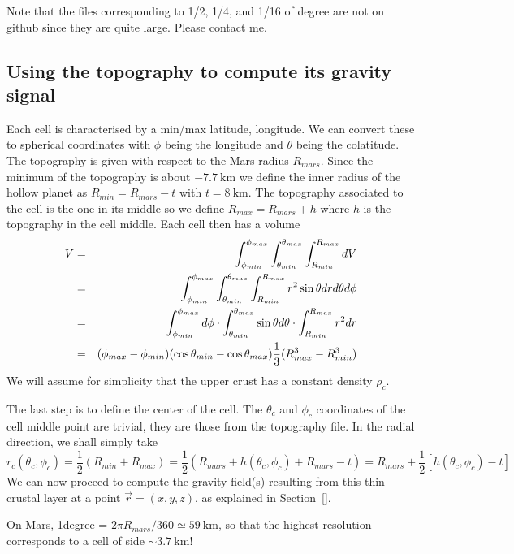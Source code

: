 Note that the files corresponding to 1/2, 1/4, and 1/16 of degree are not on github since they are quite large. 
Please contact me.

\subsection*{Using the topography to compute its gravity signal}

Each cell is characterised by a min/max latitude, longitude. We can convert these to 
spherical coordinates with $\phi$ being the longitude and $\theta$ being the colatitude.
The topography is given with respect to the Mars radius $R_{mars}$. Since the minimum 
of the topography is about $-7.7~\si{\km}$ we define the inner radius of the hollow planet 
as $R_{min}=R_{mars}-t$ with $t=8~\si{\km}$. The topography associated to the cell is the one in its middle
so we define $R_{max}=R_{mars}+h$ where $h$ is the topography in the cell middle. 
Each cell then has a volume
\begin{eqnarray}
V
&=&
\int_{\phi_{min}}^{\phi_{max}}
\int_{\theta_{min}}^{\theta_{max}}
\int_{R_{min}}^{R_{max}}
dV \nonumber\\
&=&
\int_{\phi_{min}}^{\phi_{max}}
\int_{\theta_{min}}^{\theta_{max}}
\int_{R_{min}}^{R_{max}}
r^2 \sin\theta dr d\theta d\phi \nonumber\\
&=&
\int_{\phi_{min}}^{\phi_{max}} d\phi \cdot
\int_{\theta_{min}}^{\theta_{max}} \sin\theta d\theta \cdot 
\int_{R_{min}}^{R_{max}} r^2 dr\nonumber\\
&=&
(\phi_{max} -\phi_{min})
(\cos \theta_{min} -\cos\theta_{max})
\frac13 (R_{max}^3-R_{min}^3)
\end{eqnarray}
We will assume for simplicity that the upper crust has a constant density $\rho_c$. 

The last step is to define the center of the cell. The $\theta_c$ and $\phi_c$ 
coordinates of the cell middle point are trivial, they are those from the 
topography file. In the radial direction, we shall simply take
\[
r_c(\theta_c,\phi_c)=\frac12( R_{min}+R_{max})=\frac12 (R_{mars}+h(\theta_c,\phi_c)+R_{mars}-t)= R_{mars} + \frac12[h(\theta_c,\phi_c)-t]
\]
We can now proceed to compute the gravity field(s) 
resulting from this thin crustal layer at a point $\vec{r}=(x,y,z)$, as 
explained in Section~\ref{}.


On Mars, 1degree = $2\pi R_{mars}/360 \simeq 59~\si{\km}$, so that the highest resolution
corresponds to a cell of side $\sim 3.7~\si{\km}$!


